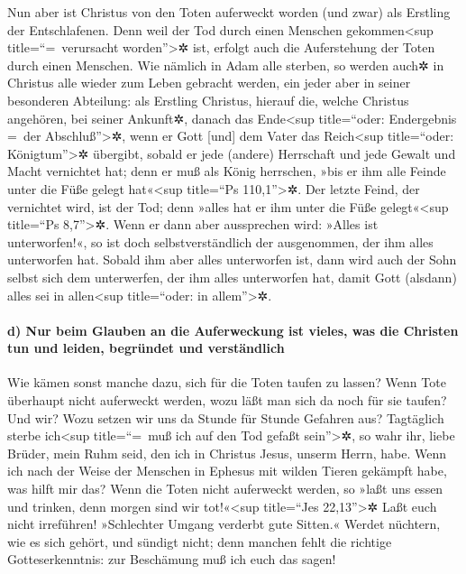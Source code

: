  Nun aber ist Christus von den Toten auferweckt worden
(und zwar) als Erstling der Entschlafenen.  Denn weil der
Tod durch einen Menschen gekommen\textless sup title=``=~verursacht
worden''\textgreater✲ ist, erfolgt auch die Auferstehung der Toten durch
einen Menschen.  Wie nämlich in Adam alle sterben, so
werden auch✲ in Christus alle wieder zum Leben gebracht werden,
 ein jeder aber in seiner besonderen Abteilung: als
Erstling Christus, hierauf die, welche Christus angehören, bei seiner
Ankunft✲,  danach das Ende\textless sup title=``oder:
Endergebnis =~der Abschluß''\textgreater✲, wenn er Gott {[}und{]} dem
Vater das Reich\textless sup title=``oder: Königtum''\textgreater✲
übergibt, sobald er jede (andere) Herrschaft und jede Gewalt und Macht
vernichtet hat;  denn er muß als König herrschen, »bis er
ihm alle Feinde unter die Füße gelegt hat«\textless sup title=``Ps
110,1''\textgreater✲.  Der letzte Feind, der vernichtet
wird, ist der Tod;  denn »alles hat er ihm unter die Füße
gelegt«\textless sup title=``Ps 8,7''\textgreater✲. Wenn er dann aber
aussprechen wird: »Alles ist unterworfen!«, so ist doch
selbstverständlich der ausgenommen, der ihm alles unterworfen hat.
 Sobald ihm aber alles unterworfen ist, dann wird auch
der Sohn selbst sich dem unterwerfen, der ihm alles unterworfen hat,
damit Gott (alsdann) alles sei in allen\textless sup title=``oder: in
allem''\textgreater✲.

\hypertarget{d-nur-beim-glauben-an-die-auferweckung-ist-vieles-was-die-christen-tun-und-leiden-begruxfcndet-und-verstuxe4ndlich}{%
\paragraph{d) Nur beim Glauben an die Auferweckung ist vieles, was die
Christen tun und leiden, begründet und
verständlich}\label{d-nur-beim-glauben-an-die-auferweckung-ist-vieles-was-die-christen-tun-und-leiden-begruxfcndet-und-verstuxe4ndlich}}

 Wie kämen sonst manche dazu, sich für die Toten taufen
zu lassen? Wenn Tote überhaupt nicht auferweckt werden, wozu läßt man
sich da noch für sie taufen?  Und wir? Wozu setzen wir
uns da Stunde für Stunde Gefahren aus?  Tagtäglich sterbe
ich\textless sup title=``=~muß ich auf den Tod gefaßt
sein''\textgreater✲, so wahr ihr, liebe Brüder, mein Ruhm seid, den ich
in Christus Jesus, unserm Herrn, habe.  Wenn ich nach der
Weise der Menschen in Ephesus mit wilden Tieren gekämpft habe, was hilft
mir das? Wenn die Toten nicht auferweckt werden, so »laßt uns essen und
trinken, denn morgen sind wir tot!«\textless sup title=``Jes
22,13''\textgreater✲  Laßt euch nicht irreführen!
»Schlechter Umgang verderbt gute Sitten.«  Werdet
nüchtern, wie es sich gehört, und sündigt nicht; denn manchen fehlt die
richtige Gotteserkenntnis: zur Beschämung muß ich euch das sagen!

